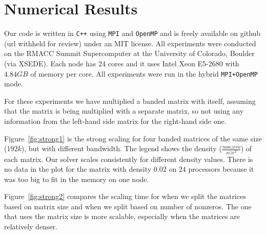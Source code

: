 \section{Numerical Results}
\label{sec:results}

Our code is written in \texttt{C++} using \texttt{MPI} and \texttt{OpenMP} and is freely available on github (url withheld for review) under an MIT license. 
All experiments were conducted on the RMACC Summit Supercomputer at the University of Colorado, Boulder (via XSEDE). Each node has 24 cores and it uses Intel Xeon E5-2680 with $4.84GB$ of memory per core. All experiments were run in the hybrid \texttt{MPI+OpenMP} mode. 


For these experiments we have multiplied a banded matrix with itself, assuming that the matrix is being multiplied with a separate matrix, so not using any information from the left-hand side matrix for the right-hand side one.

Figure~\ref{fig:strong1} is the strong scaling for four banded matrices of the same size ($192k$), but with different bandwidth. The legend shows the density ($\frac{nonzero}{size^2}$) of each matrix. Our solver scales consistently for different density values. There is no data in the plot for the matrix with density $0.02$ on $24$ processors because it was too big to fit in the memory on one node.

Figure~\ref{fig:strong2} compares the scaling time for when we split the matrices based on matrix size and when we split based on number of nonzeros. The one that uses the matrix size is more scalable, especially when the matrices are relatively denser.

